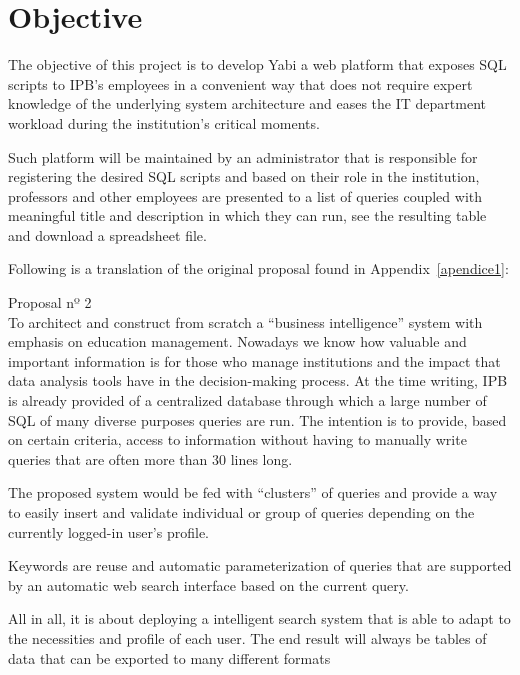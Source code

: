 \section{Objective}\label{objective}

The objective of this project is to develop \gls{Yabi} a web platform that exposes \gls{SQL} scripts to \gls{IPB}'s employees in a convenient way that does not require expert knowledge of the underlying system architecture and eases the \gls{IT} department workload during the institution's critical moments.

Such platform will be maintained by an administrator that is responsible for registering the desired \gls{SQL} scripts and based on their role in the institution, professors and other employees are presented to a list of queries coupled with meaningful title and description in which they can run, see the resulting table and download a spreadsheet file.

Following is a translation of the original proposal found in Appendix~\ref{apendice1}:

\begin{displayquote}
  Proposal nº 2\\
  To architect and construct from scratch a ``business intelligence'' system with emphasis on education management.
  Nowadays we know how valuable and important information is for those who manage institutions and the impact that data analysis tools have in the decision-making process.
  At the time writing, \gls{IPB} is already provided of a centralized database through which a large number of \gls{SQL} of many diverse purposes queries are run.
  The intention is to provide, based on certain criteria, access to information without having to manually write queries that are often more than 30 lines long.

  The proposed system would be fed with ``clusters'' of queries and provide a way to easily insert and validate individual or group of queries depending on the currently logged-in user's profile.

  Keywords are reuse and automatic parameterization of queries that are supported by an automatic web search interface based on the current query.

  All in all, it is about deploying a intelligent search system that is able to adapt to the necessities and profile of each user. The end result will always be tables of data that can be exported to many different formats
\end{displayquote}

